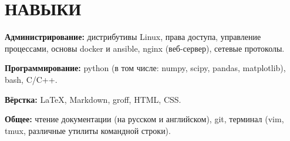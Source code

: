 \section{НАВЫКИ}

\begin{description}

    \setlength\itemsep{-0.4em}

    \item{\bfseries Администрирование:}
    дистрибутивы Linux, права доступа, управление процессами, основы docker и ansible, nginx (веб-сервер),
    сетевые протоколы.
    
    \item{\bfseries Программирование:}
    python (в том числе: numpy, scipy, pandas, matplotlib), bash, C/C++.
    
    \item{\bfseries Вёрстка:}
    \LaTeX, Markdown, groff, HTML, CSS.

    \item{\bfseries Общее:}
    чтение документации (на русском и английском), git, терминал (vim, tmux, различные утилиты командной строки).

\end{description}
    
    \vspace{.7em}
